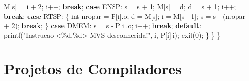 \documentclass[
  brazilian,
  letterpaper,
]{book}
\newenvironment{Shaded}{\begin{snugshade}}{\end{snugshade}}
\newcommand{\ControlFlowTok}[1]{\textcolor[rgb]{0.00,0.23,0.31}{\textbf{#1}}}
\newcommand{\DataTypeTok}[1]{\textcolor[rgb]{0.68,0.00,0.00}{#1}}
\newcommand{\DecValTok}[1]{\textcolor[rgb]{0.68,0.00,0.00}{#1}}
\newcommand{\NormalTok}[1]{\textcolor[rgb]{0.00,0.23,0.31}{#1}}
\newcommand{\OperatorTok}[1]{\textcolor[rgb]{0.37,0.37,0.37}{#1}}
\newcommand{\SpecialCharTok}[1]{\textcolor[rgb]{0.37,0.37,0.37}{#1}}
\newcommand{\StringTok}[1]{\textcolor[rgb]{0.13,0.47,0.30}{#1}}
\theoremstyle{plain}
\theoremstyle{definition}
\theoremstyle{remark}
\begin{document}
\begin{Shaded}
\begin{Highlighting}[]
\NormalTok{            M}\OperatorTok{[}\NormalTok{s}\OperatorTok{]} \OperatorTok{=}\NormalTok{ i }\OperatorTok{+} \DecValTok{2}\OperatorTok{;}
\NormalTok{            i}\OperatorTok{++;}
            \ControlFlowTok{break}\OperatorTok{;}
        \ControlFlowTok{case}\NormalTok{ ENSP}\OperatorTok{:}
\NormalTok{            s }\OperatorTok{=}\NormalTok{ s }\OperatorTok{+} \DecValTok{1}\OperatorTok{;}
\NormalTok{            M}\OperatorTok{[}\NormalTok{s}\OperatorTok{]} \OperatorTok{=}\NormalTok{ d}\OperatorTok{;}
\NormalTok{            d }\OperatorTok{=}\NormalTok{ s }\OperatorTok{+} \DecValTok{1}\OperatorTok{;}
\NormalTok{            i}\OperatorTok{++;}
            \ControlFlowTok{break}\OperatorTok{;}
        \ControlFlowTok{case}\NormalTok{ RTSP}\OperatorTok{:}
        \OperatorTok{\{}
            \DataTypeTok{int}\NormalTok{ nropar }\OperatorTok{=}\NormalTok{ P}\OperatorTok{[}\NormalTok{i}\OperatorTok{].}\NormalTok{o}\OperatorTok{;}
\NormalTok{            d }\OperatorTok{=}\NormalTok{ M}\OperatorTok{[}\NormalTok{s}\OperatorTok{];}
\NormalTok{            i }\OperatorTok{=}\NormalTok{ M}\OperatorTok{[}\NormalTok{s }\OperatorTok{{-}} \DecValTok{1}\OperatorTok{];}
\NormalTok{            s }\OperatorTok{=}\NormalTok{ s }\OperatorTok{{-}} \OperatorTok{(}\NormalTok{nropar }\OperatorTok{+} \DecValTok{2}\OperatorTok{);}
            \ControlFlowTok{break}\OperatorTok{;}
        \OperatorTok{\}}
        \ControlFlowTok{case}\NormalTok{ DMEM}\OperatorTok{:}
\NormalTok{            s }\OperatorTok{=}\NormalTok{ s }\OperatorTok{{-}}\NormalTok{ P}\OperatorTok{[}\NormalTok{i}\OperatorTok{].}\NormalTok{o}\OperatorTok{;}
\NormalTok{            i}\OperatorTok{++;}
            \ControlFlowTok{break}\OperatorTok{;}
        \ControlFlowTok{default}\OperatorTok{:}
\NormalTok{            printf}\OperatorTok{(}\StringTok{"Instrucao \textless{}}\SpecialCharTok{\%d}\StringTok{,}\SpecialCharTok{\%d}\StringTok{\textgreater{} MVS desconhecida!"}\OperatorTok{,}\NormalTok{ i}\OperatorTok{,}\NormalTok{ P}\OperatorTok{[}\NormalTok{i}\OperatorTok{].}\NormalTok{i}\OperatorTok{);}
\NormalTok{            exit}\OperatorTok{(}\DecValTok{0}\OperatorTok{);}
        \OperatorTok{\}}
    \OperatorTok{\}}
\OperatorTok{\}}
\end{Highlighting}
\end{Shaded}


\chapter{Projetos de Compiladores}\label{projetos-de-compiladores}
\end{document}

